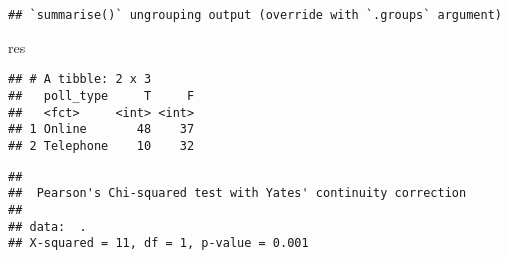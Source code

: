 \documentclass[
]{article}
\newenvironment{Shaded}{\begin{snugshade}}{\end{snugshade}}
\newcommand{\DataTypeTok}[1]{\textcolor[rgb]{0.13,0.29,0.53}{#1}}
\newcommand{\KeywordTok}[1]{\textcolor[rgb]{0.13,0.29,0.53}{\textbf{#1}}}
\newcommand{\NormalTok}[1]{#1}
\newcommand{\OperatorTok}[1]{\textcolor[rgb]{0.81,0.36,0.00}{\textbf{#1}}}
\newcommand{\OtherTok}[1]{\textcolor[rgb]{0.56,0.35,0.01}{#1}}
\newcommand{\StringTok}[1]{\textcolor[rgb]{0.31,0.60,0.02}{#1}}
\begin{document}
\begin{verbatim}
## `summarise()` ungrouping output (override with `.groups` argument)
\end{verbatim}

\begin{Shaded}
\begin{Highlighting}[]
\NormalTok{res}
\end{Highlighting}
\end{Shaded}

\begin{verbatim}
## # A tibble: 2 x 3
##   poll_type     T     F
##   <fct>     <int> <int>
## 1 Online       48    37
## 2 Telephone    10    32
\end{verbatim}

\begin{Shaded}
\end{Shaded}

\begin{verbatim}
## 
##  Pearson's Chi-squared test with Yates' continuity correction
## 
## data:  .
## X-squared = 11, df = 1, p-value = 0.001
\end{verbatim}
\end{document}
